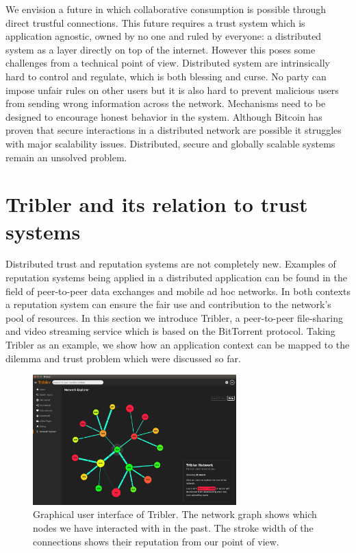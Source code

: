 We envision a future in which collaborative consumption is possible through direct trustful connections. This
future requires a trust system which is application agnostic, owned by no one and ruled by 
everyone: a distributed system as a layer directly on top of the internet. However this poses some 
challenges from a technical point of view. Distributed system are intrinsically hard to control and regulate, which is both 
blessing and curse. No party can impose unfair rules on other users but it is also hard to prevent 
malicious users from sending wrong information across the network. Mechanisms need to be designed to
encourage honest behavior in the system. Although Bitcoin has proven that secure interactions in a
distributed network are possible it struggles with major scalability issues.\cite{gervais2016security}
Distributed, secure and globally scalable systems remain an unsolved problem. 

\section{Tribler and its relation to trust systems}
Distributed trust and reputation systems are not completely new. Examples of reputation systems
being applied in a distributed application can be found in the field of peer-to-peer
data exchanges and mobile ad hoc networks. \cite{HENDRIKX2015184} In both contexts a reputation system
can ensure the fair use and contribution to the network's pool of resources. In this section we 
introduce Tribler, a peer-to-peer file-sharing and video streaming service which is based on the 
BitTorrent protocol. Taking Tribler as an example, we show how an application context can be mapped to 
the dilemma and trust problem which were discussed so far.

\begin{figure}
    \centering
    \includegraphics[width=0.7\textwidth]{images/tribler}
    \caption{Graphical user interface of Tribler. The network graph shows which nodes we have 
    interacted with in the past. The stroke width of the connections shows their reputation from 
    our point of view.}
    \label{fig:tribler}
\end{figure}

